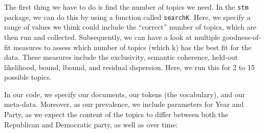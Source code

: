 \documentclass[
]{book}
\newenvironment{Shaded}{\begin{snugshade}}{\end{snugshade}}
\newcommand{\AttributeTok}[1]{\textcolor[rgb]{0.77,0.63,0.00}{#1}}
\newcommand{\ConstantTok}[1]{\textcolor[rgb]{0.00,0.00,0.00}{#1}}
\newcommand{\DecValTok}[1]{\textcolor[rgb]{0.00,0.00,0.81}{#1}}
\newcommand{\FunctionTok}[1]{\textcolor[rgb]{0.00,0.00,0.00}{#1}}
\newcommand{\NormalTok}[1]{#1}
\newcommand{\OtherTok}[1]{\textcolor[rgb]{0.56,0.35,0.01}{#1}}
\newcommand{\SpecialCharTok}[1]{\textcolor[rgb]{0.00,0.00,0.00}{#1}}
\begin{document}
The first thing we have to do is find the number of topics we need. In the \texttt{stm} package, we can do this by using a function called \texttt{searchK}. Here, we specify a range of values we think could include the ``correct'' number of topics, which are then run and collected. Subsequently, we can have a look at multiple goodness-of-fit measures to assess which number of topics (which k) has the best fit for the data. These measures include the exclusivity, semantic coherence, held-out likelihood, bound, lbound, and residual dispersion. Here, we run this for 2 to 15 possible topics.

In our code, we specify our documents, our tokens (the vocabulary), and our meta-data. Moreover, as our prevalence, we include parameters for Year and Party, as we expect the content of the topics to differ between both the Republican and Democratic party, as well as over time:

\begin{Shaded}
\end{Shaded}
\end{document}
